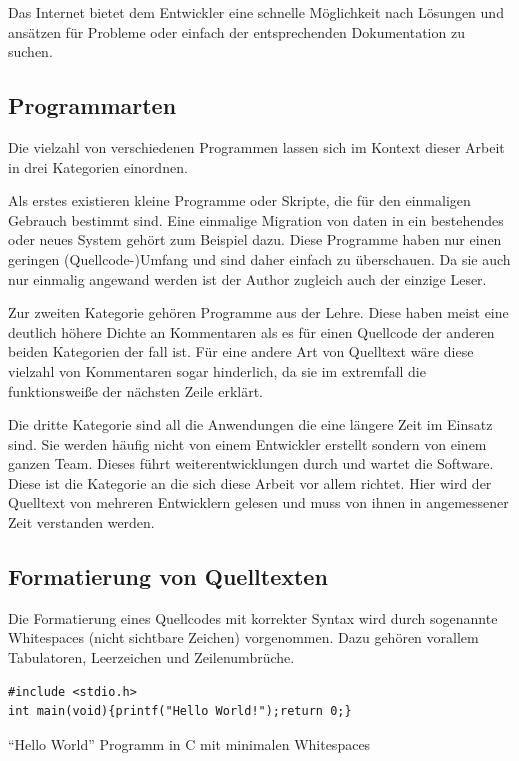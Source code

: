 Das Internet bietet dem Entwickler eine schnelle Möglichkeit nach Lösungen und
ansätzen für Probleme oder einfach der entsprechenden Dokumentation zu suchen.

\subsection{Programmarten}

Die vielzahl von verschiedenen Programmen lassen sich im Kontext dieser Arbeit in
drei Kategorien einordnen.

Als erstes existieren kleine Programme oder Skripte, die für den einmaligen
Gebrauch bestimmt sind. Eine einmalige Migration von daten in ein bestehendes
oder neues System gehört zum Beispiel dazu. Diese Programme haben nur einen
geringen (Quellcode-)Umfang und sind daher einfach zu überschauen.
Da sie auch nur einmalig angewand werden ist der Author zugleich auch der
einzige Leser.

Zur zweiten Kategorie gehören Programme aus der Lehre. Diese haben meist eine
deutlich höhere Dichte an Kommentaren als es für einen Quellcode der anderen
beiden Kategorien der fall ist. Für eine andere Art von Quelltext wäre diese
vielzahl von Kommentaren sogar hinderlich, da sie im extremfall die funktionsweiße
der nächsten Zeile erklärt.

Die dritte Kategorie sind all die Anwendungen die eine längere Zeit im Einsatz sind.
Sie werden häufig nicht von einem Entwickler erstellt sondern von einem ganzen Team.
Dieses führt weiterentwicklungen durch und wartet die Software.
Diese ist die Kategorie an die sich diese Arbeit vor allem richtet.
Hier wird der Quelltext von mehreren Entwicklern gelesen und muss von ihnen in
angemessener Zeit verstanden werden.

\subsection{Formatierung von Quelltexten}

Die Formatierung eines Quellcodes mit korrekter Syntax wird durch
sogenannte Whitespaces (nicht sichtbare Zeichen) vorgenommen.
Dazu gehören vorallem Tabulatoren, Leerzeichen und Zeilenumbrüche.

\begin{listing}[H]
    \begin{verbatim}
#include <stdio.h>
int main(void){printf("Hello World!");return 0;}
    \end{verbatim}
    \caption{\enquote{Hello World} Programm in C mit minimalen Whitespaces}
    \label{grundlagen:hellocminimal}
\end{listing}

